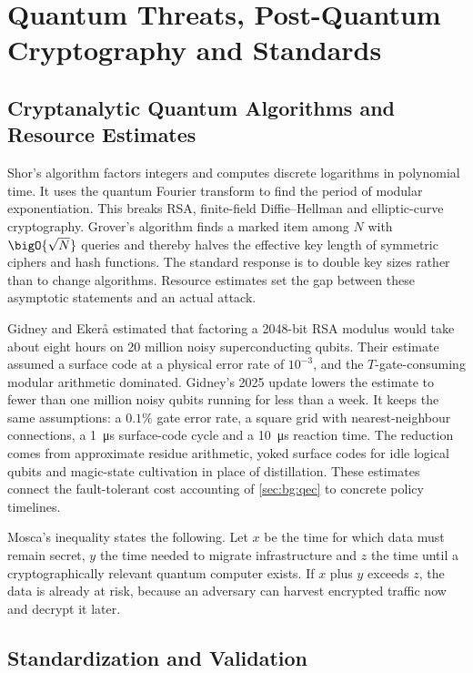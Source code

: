\section{Quantum Threats, Post-Quantum Cryptography and Standards}\label{sec:bg:crypto}

\subsection{Cryptanalytic Quantum Algorithms and Resource Estimates}

Shor's algorithm \cite{shor1997factoring} factors integers and computes discrete logarithms in polynomial time. It uses the quantum Fourier transform to find the period of modular exponentiation. This breaks RSA, finite-field Diffie--Hellman and elliptic-curve cryptography. Grover's algorithm \cite{grover1996search} finds a marked item among $N$ with $\bigO{\sqrt{N}}$ queries and thereby halves the effective key length of symmetric ciphers and hash functions. The standard response is to double key sizes rather than to change algorithms. Resource estimates set the gap between these asymptotic statements and an actual attack.

Gidney and Eker{\aa} \cite{gidney2021rsa} estimated that factoring a 2048-bit RSA modulus would take about eight hours on 20 million noisy superconducting qubits. Their estimate assumed a surface code at a physical error rate of $10^{-3}$, and the $T$-gate-consuming modular arithmetic dominated. Gidney's 2025 update \cite{gidney2025million} lowers the estimate to fewer than one million noisy qubits running for less than a week. It keeps the same assumptions: a $0.1\%$ gate error rate, a square grid with nearest-neighbour connections, a \SI{1}{\micro\second} surface-code cycle and a \SI{10}{\micro\second} reaction time. The reduction comes from approximate residue arithmetic, yoked surface codes for idle logical qubits and magic-state cultivation in place of distillation. These estimates connect the fault-tolerant cost accounting of \cref{sec:bg:qec} to concrete policy timelines.

Mosca's inequality \cite{mosca2018cybersecurity} states the following. Let $x$ be the time for which data must remain secret, $y$ the time needed to migrate infrastructure and $z$ the time until a cryptographically relevant quantum computer exists. If $x$ plus $y$ exceeds $z$, the data is already at risk, because an adversary can harvest encrypted traffic now and decrypt it later.

\subsection{Standardization and Validation}

